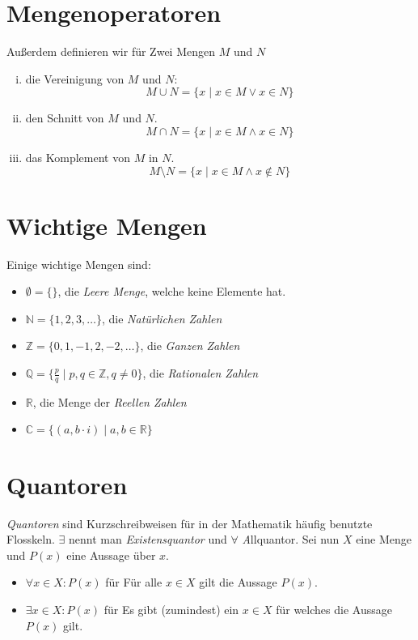 \documentclass{scrreprt}
\newcommand{\NN}{\mathbb{N}}
\newcommand{\ZZ}{\mathbb{Z}}
\newcommand{\QQ}{\mathbb{Q}}
\newcommand{\RR}{\mathbb{R}}
\newcommand{\CC}{\mathbb{C}}
\begin{document}
	\section{Mengenoperatoren}
	Außerdem definieren wir für Zwei Mengen $M$ und $N$
	\begin{enumerate}[i)]
		\item
			die Vereinigung von $M$ und $N$:\\
			\[
				M \cup N = \lbrace x \mid x \in M \lor x \in N \rbrace
			\]
		\item
			den Schnitt von $M$ und $N$.
			\[
				M \cap N = \lbrace x \mid x \in M \land x \in N \rbrace
			\]
		\item
			das Komplement von $M$ in $N$.
			\[
				M \setminus N = \lbrace x \mid x \in M \land x \notin N \rbrace
			\]
	\end{enumerate}

	\section{Wichtige Mengen}
		Einige wichtige Mengen sind:
		\begin{itemize}
			\item
				$\emptyset = \lbrace \rbrace$, die \emph{Leere Menge}, welche keine Elemente hat.
			\item
				$\NN = \lbrace 1, 2, 3, \dots \rbrace$, die \emph{Natürlichen Zahlen}
			\item
				$\ZZ = \lbrace 0, 1, -1, 2, -2, \dots \rbrace$, die \emph{Ganzen Zahlen}
			\item
				$\QQ = \lbrace \frac{p}{q} \mid p,q \in \ZZ, q \neq 0\rbrace$, die \emph{Rationalen Zahlen}
			\item
				$\RR$, die Menge der \emph{Reellen Zahlen}
			\item
				$\CC = \lbrace (a, b \cdot i) \mid a, b \in \RR \rbrace$
 		\end{itemize}

	\section{Quantoren}
	\emph{Quantoren} sind Kurzschreibweisen für in der Mathematik häufig benutzte Flosskeln. $\exists$ nennt man \emph{Existensquantor} und $\forall$ \emph Allquantor. Sei nun $X$ eine Menge und $P(x)$ eine Aussage über $x$.
	\begin{itemize}
		\item
			$\forall x \in X : P(x)$ für \glqq Für alle $x \in X$ gilt die Aussage $P(x)$.\grqq
		\item
			$\exists x \in X : P(x)$ für \glqq Es gibt (zumindest) ein $x \in X$ für welches die Aussage $P(x)$ gilt.\grqq
	\end{itemize}
\end{document}
